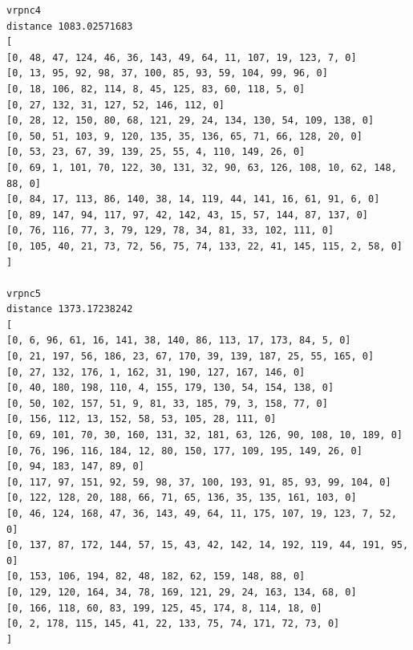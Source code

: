 \documentclass{article} %
\begin{document}
\begin{lstlisting}[breaklines, basicstyle=\tiny]
vrpnc4
distance 1083.02571683
[
[0, 48, 47, 124, 46, 36, 143, 49, 64, 11, 107, 19, 123, 7, 0]
[0, 13, 95, 92, 98, 37, 100, 85, 93, 59, 104, 99, 96, 0]
[0, 18, 106, 82, 114, 8, 45, 125, 83, 60, 118, 5, 0]
[0, 27, 132, 31, 127, 52, 146, 112, 0]
[0, 28, 12, 150, 80, 68, 121, 29, 24, 134, 130, 54, 109, 138, 0]
[0, 50, 51, 103, 9, 120, 135, 35, 136, 65, 71, 66, 128, 20, 0]
[0, 53, 23, 67, 39, 139, 25, 55, 4, 110, 149, 26, 0]
[0, 69, 1, 101, 70, 122, 30, 131, 32, 90, 63, 126, 108, 10, 62, 148, 88, 0]
[0, 84, 17, 113, 86, 140, 38, 14, 119, 44, 141, 16, 61, 91, 6, 0]
[0, 89, 147, 94, 117, 97, 42, 142, 43, 15, 57, 144, 87, 137, 0]
[0, 76, 116, 77, 3, 79, 129, 78, 34, 81, 33, 102, 111, 0]
[0, 105, 40, 21, 73, 72, 56, 75, 74, 133, 22, 41, 145, 115, 2, 58, 0]
]

vrpnc5
distance 1373.17238242
[
[0, 6, 96, 61, 16, 141, 38, 140, 86, 113, 17, 173, 84, 5, 0]
[0, 21, 197, 56, 186, 23, 67, 170, 39, 139, 187, 25, 55, 165, 0]
[0, 27, 132, 176, 1, 162, 31, 190, 127, 167, 146, 0]
[0, 40, 180, 198, 110, 4, 155, 179, 130, 54, 154, 138, 0]
[0, 50, 102, 157, 51, 9, 81, 33, 185, 79, 3, 158, 77, 0]
[0, 156, 112, 13, 152, 58, 53, 105, 28, 111, 0]
[0, 69, 101, 70, 30, 160, 131, 32, 181, 63, 126, 90, 108, 10, 189, 0]
[0, 76, 196, 116, 184, 12, 80, 150, 177, 109, 195, 149, 26, 0]
[0, 94, 183, 147, 89, 0]
[0, 117, 97, 151, 92, 59, 98, 37, 100, 193, 91, 85, 93, 99, 104, 0]
[0, 122, 128, 20, 188, 66, 71, 65, 136, 35, 135, 161, 103, 0]
[0, 46, 124, 168, 47, 36, 143, 49, 64, 11, 175, 107, 19, 123, 7, 52, 0]
[0, 137, 87, 172, 144, 57, 15, 43, 42, 142, 14, 192, 119, 44, 191, 95, 0]
[0, 153, 106, 194, 82, 48, 182, 62, 159, 148, 88, 0]
[0, 129, 120, 164, 34, 78, 169, 121, 29, 24, 163, 134, 68, 0]
[0, 166, 118, 60, 83, 199, 125, 45, 174, 8, 114, 18, 0]
[0, 2, 178, 115, 145, 41, 22, 133, 75, 74, 171, 72, 73, 0]
]
\end{lstlisting}


\newpage
\end{document}
